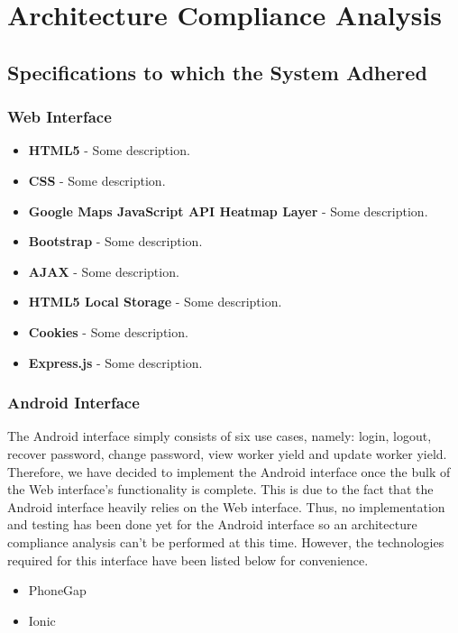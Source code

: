 \documentclass[11pt,fleqn]{book} %
\begin{document}
	


\chapter{Architecture Compliance Analysis}

	\section{Specifications to which the System Adhered}
		\subsection{Web Interface}
			\begin{itemize}
				\item\textbf{HTML5} -
				Some description.
				
				\item\textbf{CSS} -
				Some description.
				
				\item\textbf{Google Maps JavaScript API Heatmap Layer} -
				Some description.
				
				\item\textbf{Bootstrap} -
				Some description.
				
				\item\textbf{AJAX} -
				Some description.
				
				\item\textbf{HTML5 Local Storage} -
				Some description.
				
				\item\textbf{Cookies} -
				Some description.
				
				\item\textbf{Express.js} -
				Some description.
			\end{itemize}
		\subsection{Android Interface}
		The Android interface simply consists of six use cases, namely: login, logout, recover password, change password, view worker yield and update worker yield. Therefore, we have decided to implement the Android interface once the bulk of the Web interface's functionality is complete. This is due to the fact that the Android interface heavily relies on the Web interface. Thus, no implementation and testing has been done yet for the Android interface so an architecture compliance analysis can't be performed at this time. However, the technologies required for this interface have been listed below for convenience.
			\begin{itemize}
				\item{PhoneGap}				
				\item{Ionic}
			\end{itemize}
\end{document}
